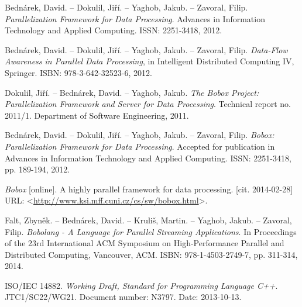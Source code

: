 
\def\bibname{References}
\begin{thebibliography}{99}
\addcontentsline{toc}{chapter}{\bibname}


	{\sc Bednárek}, David. -- {\sc Dokulil}, Jiří. -- {\sc Yaghob}, Jakub. -- {\sc Zavoral}, Filip.
	\emph{Parallelization Framework for Data Processing}.
	Advances in Information Technology and Applied Computing.
	ISSN: 2251-3418, 2012.
	
	{\sc Bednárek}, David. -- {\sc Dokulil}, Jiří. -- {\sc Yaghob}, Jakub. -- {\sc Zavoral}, Filip.
	\emph{Data-Flow Awareness in Parallel Data Processing},
	in Intelligent Distributed Computing IV, Springer.
	ISBN: 978-3-642-32523-6, 2012.

	{\sc Dokulil}, Jiří. -- {\sc Bednárek}, David. -- {\sc Yaghob}, Jakub.
	\emph{The Bobox Project: Parallelization Framework and Server for Data Processing}.
	Technical report no. 2011/1.
	Department of Software Engineering, 2011.
	
	{\sc Bednárek}, David. -- {\sc Dokulil}, Jiří. -- {\sc Yaghob}, Jakub. -- {\sc Zavoral}, Filip.
	\emph{Bobox: Parallelization Framework for Data Processing}.
	Accepted for publication in Advances in Information Technology and Applied Computing.
	ISSN: 2251-3418, pp. 189-194, 2012.
	
	\emph{Bobox} [online].
	A highly parallel framework for data processing.
	[cit. 2014-02-28]
	URL: <\url{http://www.ksi.mff.cuni.cz/cs/sw/bobox.html}>.

	{\sc Falt}, Zbyněk. -- {\sc Bednárek}, David. -- {\sc Kruliš}, Martin. -- {\sc Yaghob}, Jakub. -- {\sc Zavoral}, Filip.
	\emph{Bobolang - A Language for Parallel Streaming Applications}.
	In Proceedings of the 23rd International ACM Symposium on High-Performance Parallel and Distributed Computing, Vancouver, ACM.
	ISBN: 978-1-4503-2749-7, pp. 311-314, 2014.
	
	ISO/IEC 14882.
	\emph{Working Draft, Standard for Programming Language C++}.
	JTC1/SC22/WG21.
	Document number: N3797.
	Date: 2013-10-13.
	

\end{thebibliography}
